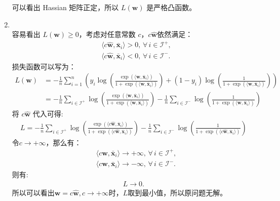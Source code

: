 \documentclass[11pt,letter,notitlepage]{article}
\begin{document}
\begin{solution}
\begin{enumerate}
	可以看出 Hassian 矩阵正定，所以 $L(\textbf{w})$ 是严格凸函数。
	\item \ \\
	容易看出 $L(\textbf{w}) \geq 0$，考虑对任意常数 $c$，$c\hat{\mathbf{w}}$依然满足：
	\begin{align*}
	    &\langle c\hat{\mathbf{w}}, \mathbf{\bar{x}}_i\rangle>0,\,\forall\,i\in\mathcal{I}^+,\\
	    &\langle c\hat{\mathbf{w}}, \mathbf{\bar{x}}_i\rangle<0,\,\forall\,i\in\mathcal{I}^-.
	\end{align*}
	损失函数可以写为：
	\begin{align*}
		L(\textbf{w})&=-\frac{1}{n}\sum_{i=1}^n \left( y_i \log ( \frac{\exp(\langle \textbf{w},  \overline{\mathbf{x}}_i \rangle)}{1+\exp(\langle \textbf{w},  \overline{\mathbf{x}}_i \rangle) } ) + (1-y_i)\log ( \frac{1}{1+\exp(\langle \textbf{w},  \overline{\mathbf{x}}_i \rangle)} ) \right)\\
		&=-\frac{1}{n}\sum_{i\in\mathcal{I}^+}\log ( \frac{\exp(\langle \textbf{w},  \overline{\mathbf{x}}_i \rangle)}{1+\exp(\langle \textbf{w},  \overline{\mathbf{x}}_i \rangle) } ) -\frac{1}{n}\sum_{i\in\mathcal{I}^-}\log ( \frac{1}{1+\exp(\langle \textbf{w},  \overline{\mathbf{x}}_i \rangle)} )
	\end{align*}
	将 $c\hat{\mathbf{w}}$ 代入可得:
	\begin{align*}
		L = -\frac{1}{n}\sum_{i\in\mathcal{I}^+}\log ( \frac{\exp(\langle c\hat{\textbf{w}},  \overline{\mathbf{x}}_i \rangle)}{1+\exp(\langle c\hat{\textbf{w}},  \overline{\mathbf{x}}_i \rangle) } ) -\frac{1}{n}\sum_{i\in\mathcal{I}^-}\log ( \frac{1}{1+\exp(\langle c\hat{\textbf{w}},  \overline{\mathbf{x}}_i \rangle)} )
	\end{align*}
	令$c\rightarrow +\infty$，那么有：
	\begin{align*}
	    &\langle c\hat{\mathbf{w}}, \mathbf{\bar{x}}_i\rangle \rightarrow +\infty,\,\forall\,i\in\mathcal{I}^+,\\
	    &\langle c\hat{\mathbf{w}}, \mathbf{\bar{x}}_i\rangle \rightarrow -\infty,\,\forall\,i\in\mathcal{I}^-.
	\end{align*}
	则有:
	\begin{align*}
		L \rightarrow 0.
	\end{align*}
	所以可以看出$\mathbf{w} = c\hat{\mathbf{w}}, c \rightarrow +\infty$时，$L$取到最小值，所以原问题无解。
	\end{enumerate}
\end{solution}
\end{document}
